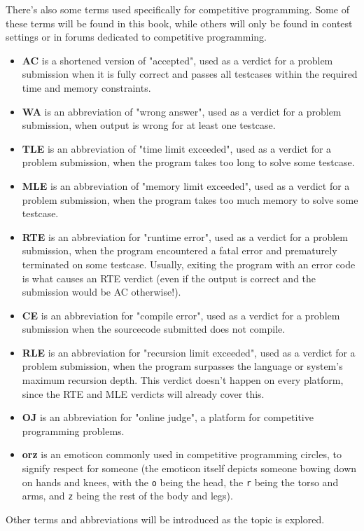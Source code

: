 There's also some terms used specifically for competitive programming. Some of these terms will be found in this book, while others will only be found in contest settings or in forums dedicated to competitive programming.

\begin{itemize}
\item \textbf{AC} is a shortened version of "accepted", used as a verdict for a problem submission when it is fully correct and passes all testcases within the required time and memory constraints.
\item \textbf{WA} is an abbreviation of "wrong answer", used as a verdict for a problem submission, when output is wrong for at least one testcase.
\item \textbf{TLE} is an abbreviation of "time limit exceeded", used as a verdict for a problem submission, when the program takes too long to solve some testcase.
\item \textbf{MLE} is an abbreviation of "memory limit exceeded", used as a verdict for a problem submission, when the program takes too much memory to solve some testcase.
\item \textbf{RTE} is an abbreviation for "runtime error", used as a verdict for a problem submission, when the program encountered a fatal error and prematurely terminated on some testcase. Usually, exiting the program with an error code is what causes an RTE verdict (even if the output is correct and the submission would be AC otherwise!).
\item \textbf{CE} is an abbreviation for "compile error", used as a verdict for a problem submission when the sourcecode submitted does not compile.
\item \textbf{RLE} is an abbreviation for "recursion limit exceeded", used as a verdict for a problem submission, when the program surpasses the language or system's maximum recursion depth. This verdict doesn't happen on every platform, since the RTE and MLE verdicts will already cover this.
\item \textbf{OJ} is an abbreviation for "online judge", a platform for competitive programming problems.
\item \textbf{orz} is an emoticon commonly used in competitive programming circles, to signify respect for someone (the emoticon itself depicts someone bowing down on hands and knees, with the \texttt{o} being the head, the \texttt{r} being the torso and arms, and \texttt{z} being the rest of the body and legs).
\end{itemize}

Other terms and abbreviations will be introduced as the topic is explored.